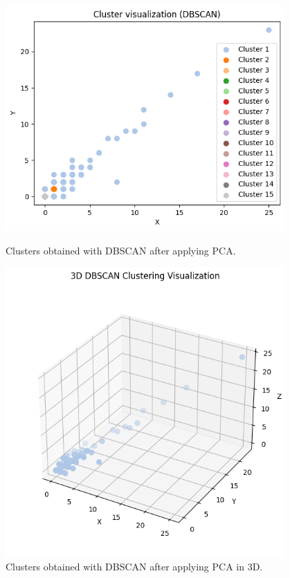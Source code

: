 \begin{appendices}
	\begin{figure}[H]
		\centering
		\begin{minipage}[t]{0.48\textwidth}
			\centering
			\includegraphics[width=0.95\textwidth]{../imgs/graphs/clustering/dbscan_nopca.png}
			\caption{Clusters obtained with DBSCAN after applying PCA.}
			\label{fig:clusters_dbscan_no_pca}
		\end{minipage}\hfill
		\begin{minipage}[t]{0.48\textwidth}
			\centering
			\includegraphics[width=0.95\textwidth]{../imgs/graphs/clustering/dbscan_nopca_3d.png}
			\caption{Clusters obtained with DBSCAN after applying PCA in 3D.}
			\label{fig:clusters_dbscan_no_pca_3d}
		\end{minipage}
	\end{figure}


\end{appendices}
